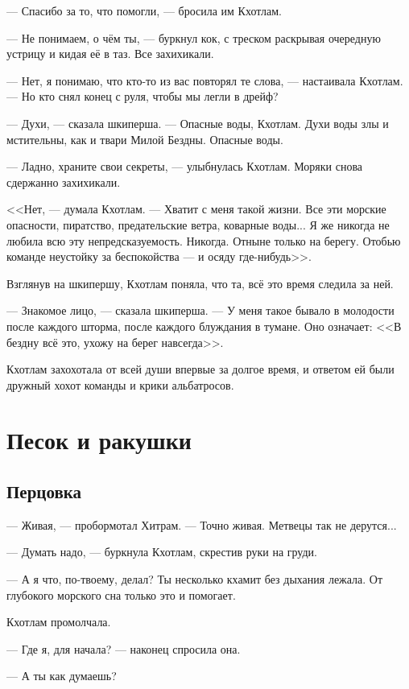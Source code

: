 --- Спасибо за то, что помогли, --- бросила им Кхотлам.

--- Не понимаем, о чём ты, --- буркнул кок, с треском раскрывая очередную устрицу и кидая её в таз.
Все захихикали.

--- Нет, я понимаю, что кто-то из вас повторял те слова, --- настаивала Кхотлам.
--- Но кто снял конец с руля, чтобы мы легли в дрейф?

--- Духи, --- сказала шкиперша.
--- Опасные воды, Кхотлам.
Духи воды злы и мстительны, как и твари Милой Бездны.
Опасные воды.

--- Ладно, храните свои секреты, --- улыбнулась Кхотлам.
Моряки снова сдержанно захихикали.

<<Нет, --- думала Кхотлам.
--- Хватит с меня такой жизни.
Все эти морские опасности, пиратство, предательские ветра, коварные воды...
Я же никогда не любила всю эту непредсказуемость.
Никогда.
Отныне только на берегу.
Отобью команде неустойку за беспокойства --- и осяду где-нибудь>>.

Взглянув на шкипершу, Кхотлам поняла, что та, всё это время следила за ней.

--- Знакомое лицо, --- сказала шкиперша.
--- У меня такое бывало в молодости после каждого шторма, после каждого блуждания в тумане.
Оно означает: <<В бездну всё это, ухожу на берег навсегда>>.

Кхотлам захохотала от всей души впервые за долгое время, и ответом ей были дружный хохот команды и крики альбатросов.

\chapter{Песок и ракушки}

\section{Перцовка}

--- Живая, --- пробормотал Хитрам.
--- Точно живая.
Метвецы так не дерутся...

--- Думать надо, --- буркнула Кхотлам, скрестив руки на груди.

--- А я что, по-твоему, делал?
Ты несколько кхамит без дыхания лежала.
От глубокого морского сна только это и помогает.

Кхотлам промолчала.

--- Где я, для начала? --- наконец спросила она.

--- А ты как думаешь?

